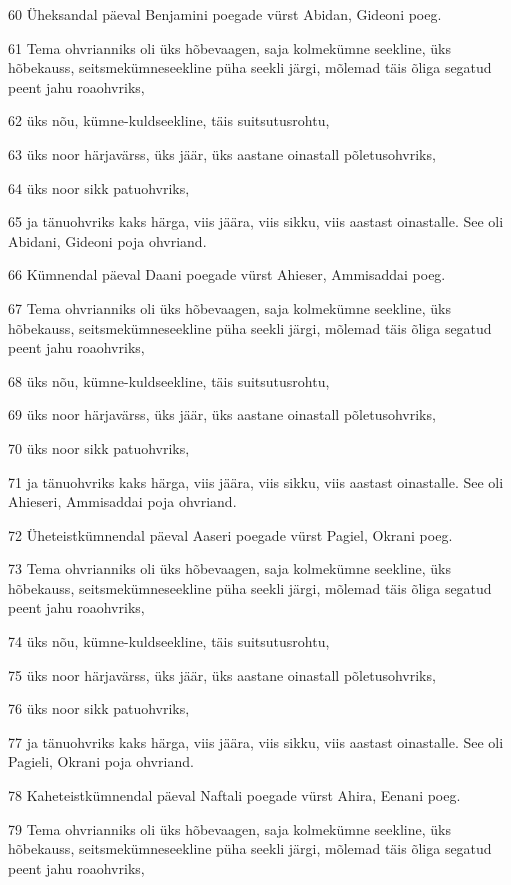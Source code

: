 \par 60 Üheksandal päeval Benjamini poegade vürst Abidan, Gideoni poeg.
\par 61 Tema ohvrianniks oli üks hõbevaagen, saja kolmekümne seekline, üks hõbekauss, seitsmekümneseekline püha seekli järgi, mõlemad täis õliga segatud peent jahu roaohvriks,
\par 62 üks nõu, kümne-kuldseekline, täis suitsutusrohtu,
\par 63 üks noor härjavärss, üks jäär, üks aastane oinastall põletusohvriks,
\par 64 üks noor sikk patuohvriks,
\par 65 ja tänuohvriks kaks härga, viis jäära, viis sikku, viis aastast oinastalle. See oli Abidani, Gideoni poja ohvriand.
\par 66 Kümnendal päeval Daani poegade vürst Ahieser, Ammisaddai poeg.
\par 67 Tema ohvrianniks oli üks hõbevaagen, saja kolmekümne seekline, üks hõbekauss, seitsmekümneseekline püha seekli järgi, mõlemad täis õliga segatud peent jahu roaohvriks,
\par 68 üks nõu, kümne-kuldseekline, täis suitsutusrohtu,
\par 69 üks noor härjavärss, üks jäär, üks aastane oinastall põletusohvriks,
\par 70 üks noor sikk patuohvriks,
\par 71 ja tänuohvriks kaks härga, viis jäära, viis sikku, viis aastast oinastalle. See oli Ahieseri, Ammisaddai poja ohvriand.
\par 72 Üheteistkümnendal päeval Aaseri poegade vürst Pagiel, Okrani poeg.
\par 73 Tema ohvrianniks oli üks hõbevaagen, saja kolmekümne seekline, üks hõbekauss, seitsmekümneseekline püha seekli järgi, mõlemad täis õliga segatud peent jahu roaohvriks,
\par 74 üks nõu, kümne-kuldseekline, täis suitsutusrohtu,
\par 75 üks noor härjavärss, üks jäär, üks aastane oinastall põletusohvriks,
\par 76 üks noor sikk patuohvriks,
\par 77 ja tänuohvriks kaks härga, viis jäära, viis sikku, viis aastast oinastalle. See oli Pagieli, Okrani poja ohvriand.
\par 78 Kaheteistkümnendal päeval Naftali poegade vürst Ahira, Eenani poeg.
\par 79 Tema ohvrianniks oli üks hõbevaagen, saja kolmekümne seekline, üks hõbekauss, seitsmekümneseekline püha seekli järgi, mõlemad täis õliga segatud peent jahu roaohvriks,
